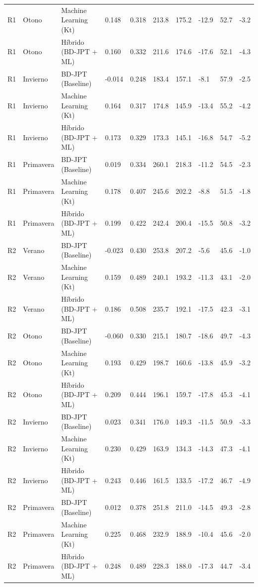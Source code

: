 \begin{table}[htpb]
\begin{tabular}{llllllllll}
R1 & Otono & Machine Learning (Kt) & 0.148 & 0.318 & 213.8 & 175.2 & -12.9 & 52.7 & -3.2 \\
R1 & Otono & Híbrido (BD-JPT + ML) & 0.160 & 0.332 & 211.6 & 174.6 & -17.6 & 52.1 & -4.3 \\
R1 & Invierno & BD-JPT (Baseline) & -0.014 & 0.248 & 183.4 & 157.1 & -8.1 & 57.9 & -2.5 \\
R1 & Invierno & Machine Learning (Kt) & 0.164 & 0.317 & 174.8 & 145.9 & -13.4 & 55.2 & -4.2 \\
R1 & Invierno & Híbrido (BD-JPT + ML) & 0.173 & 0.329 & 173.3 & 145.1 & -16.8 & 54.7 & -5.2 \\
R1 & Primavera & BD-JPT (Baseline) & 0.019 & 0.334 & 260.1 & 218.3 & -11.2 & 54.5 & -2.3 \\
R1 & Primavera & Machine Learning (Kt) & 0.178 & 0.407 & 245.6 & 202.2 & -8.8 & 51.5 & -1.8 \\
R1 & Primavera & Híbrido (BD-JPT + ML) & 0.199 & 0.422 & 242.4 & 200.4 & -15.5 & 50.8 & -3.2 \\
R2 & Verano & BD-JPT (Baseline) & -0.023 & 0.430 & 253.8 & 207.2 & -5.6 & 45.6 & -1.0 \\
R2 & Verano & Machine Learning (Kt) & 0.159 & 0.489 & 240.1 & 193.2 & -11.3 & 43.1 & -2.0 \\
R2 & Verano & Híbrido (BD-JPT + ML) & 0.186 & 0.508 & 235.7 & 192.1 & -17.5 & 42.3 & -3.1 \\
R2 & Otono & BD-JPT (Baseline) & -0.060 & 0.330 & 215.1 & 180.7 & -18.6 & 49.7 & -4.3 \\
R2 & Otono & Machine Learning (Kt) & 0.193 & 0.429 & 198.7 & 160.6 & -13.8 & 45.9 & -3.2 \\
R2 & Otono & Híbrido (BD-JPT + ML) & 0.209 & 0.444 & 196.1 & 159.7 & -17.8 & 45.3 & -4.1 \\
R2 & Invierno & BD-JPT (Baseline) & 0.023 & 0.341 & 176.0 & 149.3 & -11.5 & 50.9 & -3.3 \\
R2 & Invierno & Machine Learning (Kt) & 0.230 & 0.429 & 163.9 & 134.3 & -14.3 & 47.3 & -4.1 \\
R2 & Invierno & Híbrido (BD-JPT + ML) & 0.243 & 0.446 & 161.5 & 133.5 & -17.2 & 46.7 & -4.9 \\
R2 & Primavera & BD-JPT (Baseline) & 0.012 & 0.378 & 251.8 & 211.0 & -14.5 & 49.3 & -2.8 \\
R2 & Primavera & Machine Learning (Kt) & 0.225 & 0.468 & 232.9 & 188.9 & -10.4 & 45.6 & -2.0 \\
R2 & Primavera & Híbrido (BD-JPT + ML) & 0.248 & 0.489 & 228.3 & 188.0 & -17.3 & 44.7 & -3.4 \\

\end{tabular}
\end{table}
